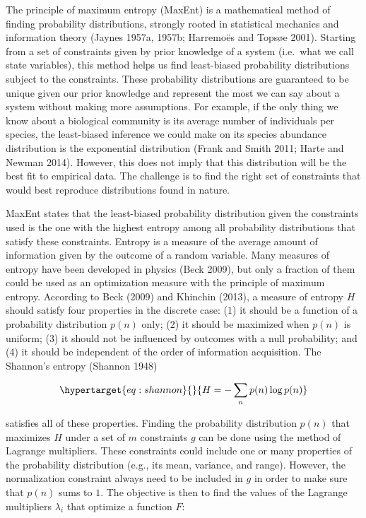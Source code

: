 \documentclass[11pt]{article}
\begin{document}
The principle of maximum entropy (MaxEnt) is a mathematical method of
finding probability distributions, strongly rooted in statistical
mechanics and information theory (Jaynes 1957a, 1957b; Harremoës and
Topsøe 2001). Starting from a set of constraints given by prior
knowledge of a system (i.e.~what we call state variables), this method
helps us find least-biased probability distributions subject to the
constraints. These probability distributions are guaranteed to be unique
given our prior knowledge and represent the most we can say about a
system without making more assumptions. For example, if the only thing
we know about a biological community is its average number of
individuals per species, the least-biased inference we could make on its
species abundance distribution is the exponential distribution (Frank
and Smith 2011; Harte and Newman 2014). However, this does not imply
that this distribution will be the best fit to empirical data. The
challenge is to find the right set of constraints that would best
reproduce distributions found in nature.

MaxEnt states that the least-biased probability distribution given the
constraints used is the one with the highest entropy among all
probability distributions that satisfy these constraints. Entropy is a
measure of the average amount of information given by the outcome of a
random variable. Many measures of entropy have been developed in physics
(Beck 2009), but only a fraction of them could be used as an
optimization measure with the principle of maximum entropy. According to
Beck (2009) and Khinchin (2013), a measure of entropy \(H\) should
satisfy four properties in the discrete case: (1) it should be a
function of a probability distribution \(p(n)\) only; (2) it should be
maximized when \(p(n)\) is uniform; (3) it should not be influenced by
outcomes with a null probability; and (4) it should be independent of
the order of information acquisition. The Shannon's entropy (Shannon
1948)

\begin{equation}\protect\hypertarget{eq:shannon}{}{H = -\sum_{n} p(n) \log p(n)}\label{eq:shannon}\end{equation}

satisfies all of these properties. Finding the probability distribution
\(p(n)\) that maximizes \(H\) under a set of \(m\) constraints \(g\) can
be done using the method of Lagrange multipliers. These constraints
could include one or many properties of the probability distribution
(e.g., its mean, variance, and range). However, the normalization
constraint always need to be included in \(g\) in order to make sure
that \(p(n)\) sums to \(1\). The objective is then to find the values of
the Lagrange multipliers \(\lambda_i\) that optimize a function \(F\):
\end{document}
